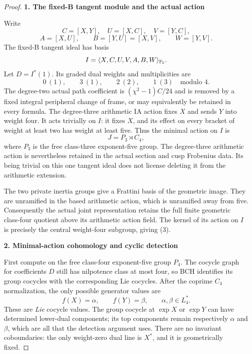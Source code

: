 \begin{proof}
\par\medskip\noindent\textbf{1. The fixed-B tangent module and the actual action}\par\nobreak\smallskip
Write
\[
 C=[X,Y],\quad U=[X,C],\quad V=[Y,C],
\]
\[
 A=[X,U],\qquad B=[Y,U]=[X,V],\qquad W=[Y,V].
\]
The fixed-B tangent ideal has basis
\[
 I=\langle X,C,U,V,A,B,W\rangle_{\mathbb F_5}.
\]
Let $D=I^*(1)$. Its graded dual weights and multiplicities are
\[
 0\ (1),\qquad 3\ (1),\qquad 2\ (2),\qquad 1\ (3)
 \quad\text{modulo }4.
 \tag{2}
\]
The degree-two actual path coefficient is $(\chi^2-1)C/24$ and is removed by a fixed integral peripheral change of frame, or may equivalently be retained in every formula. The degree-three arithmetic IA action fixes $X$ and sends $Y$ into weight four. It acts trivially on $I$: it fixes $X$, and its effect on every bracket of weight at least two has weight at least five. Thus the minimal action on $I$ is
\[
 J=P_3\rtimes C_4,
 \tag{3}
\]
where $P_3$ is the free class-three exponent-five group. The degree-three arithmetic action is nevertheless retained in the actual section and cusp Frobenius data. Its being trivial on this one tangent ideal does not license deleting it from the arithmetic extension.

The two private inertia groups give a Frattini basis of the geometric image. They are unramified in the based arithmetic action, which is unramified away from five. Consequently the actual joint representation retains the full finite geometric class-four quotient above its arithmetic action field. The kernel of its action on $I$ is precisely the central weight-four subgroup, giving (3).

\par\medskip\noindent\textbf{2. Minimal-action cohomology and cyclic detection}\par\nobreak\smallskip
First compute on the free class-four exponent-five group $P_4$. The cocycle graph for coefficients $D$ still has nilpotence class at most four, so BCH identifies its group cocycles with the corresponding Lie cocycles. After the coprime $C_4$ normalization, the only possible generator values are
\[
 f(X)=\alpha,\qquad f(Y)=\beta,
 \qquad \alpha,\beta\in L_4^*.
 \tag{4}
\]
These are \emph{Lie} cocycle values. The group cocycle at $\exp X$ or $\exp Y$ can have determined lower-dual components; its top components remain respectively $\alpha$ and $\beta$, which are all that the detection argument uses. There are no invariant coboundaries: the only weight-zero dual line is $X^*$, and it is geometrically fixed.


\end{proof}
